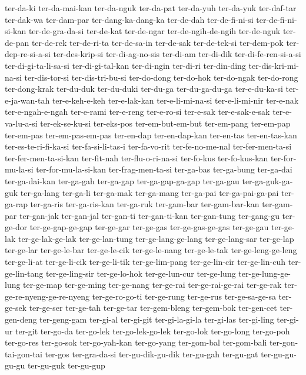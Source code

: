 {ter-da-ki ter-da-mai-kan ter-da-nguk ter-da-pat ter-da-yuh ter-da-yuk
ter-daf-tar ter-dak-wa ter-dam-par ter-dang-ka-dang-ka ter-de-dah
ter-de-fi-ni-si ter-de-fi-ni-si-kan ter-de-gra-da-si ter-de-kat
ter-de-ngar ter-de-ngih-de-ngih ter-de-nguk ter-de-pan ter-de-rek
ter-de-ri-ta ter-de-sa-in ter-de-sak ter-de-tek-si ter-dem-pok
ter-dep-re-si-a-si ter-des-krip-si ter-di-ag-no-sis ter-di-am ter-di-dik
ter-di-fe-ren-si-a-si ter-di-gi-ta-li-sa-si ter-di-gi-tal-kan ter-di-ngin
ter-di-ri ter-din-ding ter-dis-kri-mi-na-si ter-dis-tor-si
ter-dis-tri-bu-si ter-do-dong ter-do-hok ter-do-ngak ter-do-rong
ter-dong-krak ter-du-duk ter-du-duki ter-du-ga ter-du-ga-du-ga
ter-e-du-ka-si ter-e-ja-wan-tah ter-e-keh-e-keh ter-e-lak-kan
ter-e-li-mi-na-si ter-e-li-mi-nir ter-e-nak ter-e-ngah-e-ngah ter-e-rami
ter-e-reng ter-e-ro-si ter-e-sak ter-e-sak-e-sak ter-e-va-lu-a-si
ter-ek-se-ku-si ter-eks-pos ter-em-but-em-but ter-em-pang ter-em-pap
ter-em-pas ter-em-pas-em-pas ter-en-dap ter-en-dap-kan ter-en-tas
ter-en-tas-kan ter-es-te-ri-fi-ka-si ter-fa-si-li-tas-i ter-fa-vo-rit
ter-fe-no-me-nal ter-fer-men-ta-si ter-fer-men-ta-si-kan ter-fit-nah
ter-flu-o-ri-na-si ter-fo-kus ter-fo-kus-kan ter-for-mu-la-si
ter-for-mu-la-si-kan ter-frag-men-ta-si ter-ga-bas ter-ga-bung ter-ga-dai
ter-ga-dai-kan ter-ga-gah ter-ga-gap ter-ga-gap-ga-gap ter-ga-gau
ter-ga-guk-ga-guk ter-ga-lang ter-ga-li ter-ga-mak ter-ga-mang ter-ga-pai
ter-ga-pai-ga-pai ter-ga-rap ter-ga-ris ter-ga-ris-kan ter-ga-ruk
ter-gam-bar ter-gam-bar-kan ter-gam-par ter-gan-jak ter-gan-jal ter-gan-ti
ter-gan-ti-kan ter-gan-tung ter-gang-gu ter-ge-dor ter-ge-gap-ge-gap
ter-ge-gar ter-ge-gas ter-ge-gas-ge-gas ter-ge-gau ter-ge-lak
ter-ge-lak-ge-lak ter-ge-lan-tung ter-ge-lang-ge-lang ter-ge-lang-sar
ter-ge-lap ter-ge-lar ter-ge-le-bar ter-ge-le-cik ter-ge-le-nang
ter-ge-le-tak ter-ge-leng-ge-leng ter-ge-li-at ter-ge-li-cik ter-ge-li-tik
ter-ge-lim-pang ter-ge-lin-cir ter-ge-lin-cuh ter-ge-lin-tang
ter-ge-ling-sir ter-ge-lo-hok ter-ge-lun-cur ter-ge-lung
ter-ge-lung-ge-lung ter-ge-map ter-ge-ming ter-ge-nang ter-ge-rai
ter-ge-rai-ge-rai ter-ge-rak ter-ge-re-nyeng-ge-re-nyeng ter-ge-ro-go-ti
ter-ge-rung ter-ge-rus ter-ge-sa-ge-sa ter-ge-sek ter-ge-ser ter-ge-tah
ter-ge-tar ter-gem-bleng ter-gem-bok ter-gen-cet ter-gen-deng ter-geng-gam
ter-gi-al ter-gi-git ter-gi-la-gi-la ter-gi-las ter-gi-ling ter-gi-ur
ter-git ter-go-da ter-go-lek ter-go-lek-go-lek ter-go-lok ter-go-long
ter-go-poh ter-go-res ter-go-sok ter-go-yah-kan ter-go-yang ter-gom-bal
ter-gom-bali ter-gon-tai-gon-tai ter-gos ter-gra-da-si ter-gu-dik-gu-dik
ter-gu-gah ter-gu-gat ter-gu-gu-gu-gu ter-gu-guk ter-gu-gup
}
